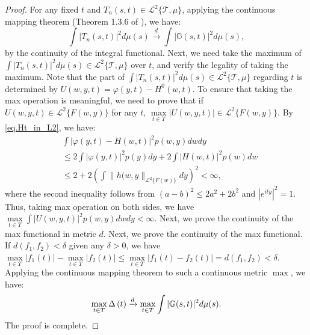 \documentclass[
  12pt]{article}
\def\cL{\mathcal{L}}
\def\cT{\mathcal{T}}
\begin{document}
\begin{proof}
For any fixed $t$ and $T_n(s,t)\in \cL^2\{\cT, \mu \}$, applying the continuous mapping theorem (Theorem 1.3.6 of \cite{wellner2013weak}), we have:
$$
\int{|T_n(s,t)|^2d\mu(s)}\xrightarrow{d}\int{|\mathbb{G} (s,t)|^2d\mu(s)},
$$
by the continuity of the integral functional. Next, we need take the maximum of $\int{|T_n(s,t)|^2d\mu(s)}\in \cL^2\{\cT, \mu\}$ over $t$, and verify the legality of taking the maximum. Note that the part of $\int{|T_n(s,t)|^2d\mu(s)}\in \cL^2\{\cT, \mu\}$ regarding $t$ is determined by $U(w,y,t)=\varphi(y,t)-H^0(w,t)$. To ensure that taking the max operation is meaningful, we need to prove that if $U(w,y,t)\in \cL^2\{F(w,y)\}$ for any $t$, $\underset{t\in T}{\max}|U(w,y,t)|\in\cL^2\{F(w,y)\}$. By \eqref{eq.Ht_in_L2}, we have: 
\begin{align*}
	&\int{|\varphi (y,t)-H(w,t)|^2p(w,y)dwdy}\\
    &\le 2\int{|\varphi (y,t)|^2p(y)dy}+2\int{|H(w,t)|^2p(w)dw}\\
	&\le 2+2\left(\int \|h(w,y\|_{\cL^2\{F(w)\}}dy \right)^2<\infty,
\end{align*}
where the second inequality follows from $(a-b)^2\le 2a^2+2b^2$ and $|e^{ity}|^2=1$. 
Thus, taking max operation on both sides, we have $\underset{t\in T}{\max} \int{| U(w,y,t) |^2p(w,y) dwdy}<\infty$. Next, we prove the continuity of the max functional in metric $d$. Next, we prove the continuity of the max functional. If $d(f_1,f_2)<\delta$ given any $\delta>0$, we have $\underset{t\in T}{\max}|f_1(t)|-\underset{t\in T}{\max}|f_2(t)|\le\underset{t\in T}{\max}|f_1(t)-f_2(t)|=d(f_1,f_2)<\delta$. Applying the continuous mapping theorem to such a continuous metric $\max$, we have:
$$
\underset{t\in T}{\max} \thinspace \Delta \left( t \right) \xrightarrow{d}\underset{t\in T}{\max}\int{|\mathbb{G} (s,t)|^2d\mu(s)}.
$$
The proof is complete. 
\end{proof}
\end{document}
